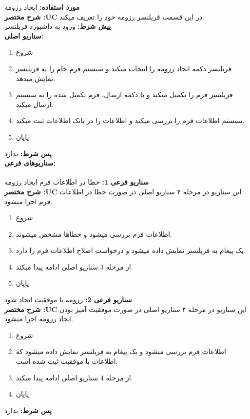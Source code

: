\documentclass[20pt,a5paper]{report}
\begin{document}
\noindent \textbf{مورد استفاده:}
ایجاد رزومه
\\
\textbf{شرح مختصر :UC}
در این قسمت فریلنسر رزومه خود را تعریف میکند.
\\
\textbf{پيش شرط:}
ورود به داشبورد فریلنسر.
\\
\textbf{سناريو اصلی:}
\begin{enumerate}
\item
شروع
\item
فریلنسر دکمه ایجاد رزومه را انتخاب میکند و سیستم فرم خام را به فریلنسر نمایش میدهد.
\item
فریلنسر فرم را تکمیل میکند و با دکمه ارسال، فرم تکمیل شده را به سیستم ارسال میکند.
\item
سیستم اطلاعات فرم را بررسی میکند و اطلاعات را در بانک اطلاعات ثبت میکند.
\item
پایان
\end{enumerate}
\textbf{پس شرط:}
ندارد.
\\
\textbf{سناريوهای فرعی:}
\\ \\
\textbf{سناريو فرعی 1:}
خطا در اطلاعات فرم ایجاد رزومه
\\
\textbf{شرح مختصر :UC}
این سناریو در مرحله ۴ سناریو اصلی در صورت خطا در اطلاعات فرم اجرا میشود.
\begin{enumerate}
\item
شروع
\item
اطلاعات فرم بررسی میشود و خطاها مشخص میشوند.
\item
یک پیغام به فریلنسر نمایش داده میشود و درخواست اصلاح اطلاعات فرم را دارد.
\item
از مرحله 3 سناریو اصلی ادامه پیدا میکند.
\item
پایان
\end{enumerate}
\textbf{سناريو فرعی 2:}
رزومه با موفقیت ایجاد شود
\\
\textbf{شرح مختصر :UC}
این سناریو در مرحله ۴ سناریو اصلی در صورت موفقیت آمیز بودن ایجاد رزومه اجرا میشود.
\begin{enumerate}
\item
شروع
\item
اطلاعات فرم بررسی میشود و یک پیغام به فریلنسر نمایش داده میشود که اطلاعات با موفقیت ثبت شده است.
\item
از مرحله 4 سناریو اصلی ادامه پیدا میکند.
\item
پایان
\end{enumerate}

\textbf{پس شرط:}
ندارد .


\centering
\vfill
\lr{\LaTeX}
\end{document}
